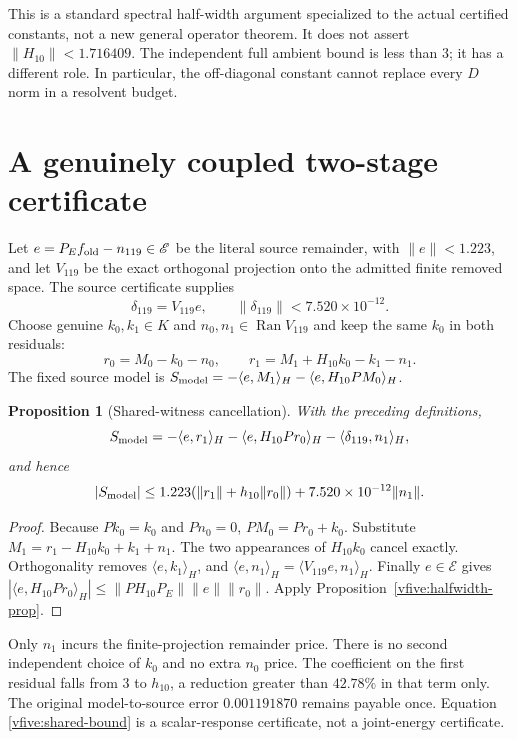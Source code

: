 \documentclass[11pt,a4paper]{article}
\numberwithin{equation}{section}
\newtheorem{proposition}[theorem]{Proposition}
\theoremstyle{definition}\newtheorem{definition}[theorem]{Definition}
\theoremstyle{remark}\newtheorem{remark}[theorem]{Remark}
\newcommand{\rhip}[2]{\langle#1,#2\rangle_H}
\begin{document}
This is a standard spectral half-width argument specialized to the actual certified constants, not a new general operator theorem. It does not assert $\|H_{10}\|<1.716409$. The independent full ambient bound is less than $3$; it has a different role. In particular, the off-diagonal constant cannot replace every $D$ norm in a resolvent budget.

\section{A genuinely coupled two-stage certificate}\label{vfive:coupled}
Let $e=P_Ef_{\rm old}-n_{119}\in\mathscr E$ be the literal source remainder, with $\|e\|<1.223$, and let $V_{119}$ be the exact orthogonal projection onto the admitted finite removed space. The source certificate supplies
\[
 \delta_{119}=V_{119}e,\qquad\|\delta_{119}\|<7.520\times10^{-12}.
\]
Choose genuine $k_0,k_1\in K$ and $n_0,n_1\in\operatorname{Ran}V_{119}$ and keep the same $k_0$ in both residuals:
\[
 r_0=M_0-k_0-n_0,\qquad
 r_1=M_1+H_{10}k_0-k_1-n_1.
\]
The fixed source model is $S_{\rm model}=-\rhip{e}{M_1}-\rhip{e}{H_{10}PM_0}$.

\begin{proposition}[Shared-witness cancellation]\label{vfive:shared}
With the preceding definitions,
\[
 S_{\rm model}=-\rhip{e}{r_1}-\rhip{e}{H_{10}Pr_0}
                 -\rhip{\delta_{119}}{n_1},
\]
and hence
\begin{equation}\label{vfive:shared-bound}
 |S_{\rm model}|\leq1.223(\|r_1\|+h_{10}\|r_0\|)
                    +7.520\times10^{-12}\|n_1\|.
\end{equation}
\end{proposition}
\begin{proof}
Because $Pk_0=k_0$ and $Pn_0=0$, $PM_0=Pr_0+k_0$. Substitute $M_1=r_1-H_{10}k_0+k_1+n_1$. The two appearances of $H_{10}k_0$ cancel exactly. Orthogonality removes $\rhip e{k_1}$, and $\rhip e{n_1}=\rhip{V_{119}e}{n_1}$. Finally $e\in\mathscr E$ gives $|\rhip e{H_{10}Pr_0}|\leq\|PH_{10}P_E\|\|e\|\|r_0\|$. Apply Proposition~\ref{vfive:halfwidth-prop}.
\end{proof}

Only $n_1$ incurs the finite-projection remainder price. There is no second independent choice of $k_0$ and no extra $n_0$ price. The coefficient on the first residual falls from $3$ to $h_{10}$, a reduction greater than $42.78\%$ in that term only. The original model-to-source error $0.001191870$ remains payable once. Equation \eqref{vfive:shared-bound} is a scalar-response certificate, not a joint-energy certificate.
\end{document}
